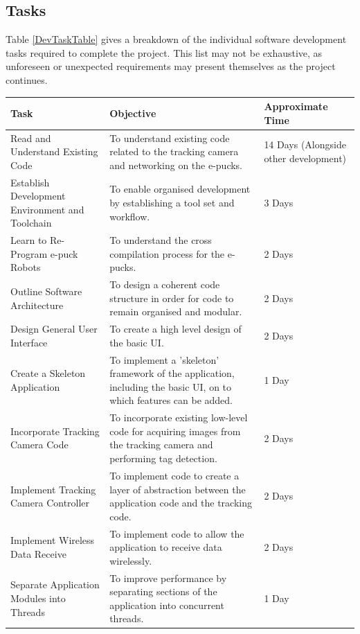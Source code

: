 \documentclass[titlepage,hidelinks,10pt]{article}
\begin{document}
\subsection{Tasks}\label{Tasks}
Table \ref{DevTaskTable} gives a breakdown of the individual software development tasks required to complete the project. This list may not be exhaustive, as unforeseen or unexpected requirements may present themselves as the project continues.

\begin{table}[H]
\begin{tabular}[h]{ |>{\raggedright}p{5cm}|>{\raggedright}p{7cm}|p{3cm}| }
  \hline
  Task & Objective & Approximate Time \\\hline
  Read and Understand Existing Code 				& To understand existing code related to the tracking camera and networking on the e-pucks. 							& 14 Days (Alongside other development)\\ \hline
  Establish Development Environment and Toolchain 	& To enable organised development by establishing a tool set and workflow. 												& 3 Days \\ \hline
  Learn to Re-Program e-puck Robots 				& To understand the cross compilation process for the e-pucks. 															& 2 Days \\ \hline
  Outline Software Architecture 					& To design a coherent code structure in order for code to remain organised and modular. 								& 2 Days \\ \hline
  Design General User Interface 					& To create a high level design of the basic UI. 																		& 2 Days \\ \hline
  Create a Skeleton Application 					& To implement a 'skeleton' framework of the application, including the basic UI, on to which features can be added. 	& 1 Day \\ \hline
  Incorporate Tracking Camera Code 					& To incorporate existing low-level code for acquiring images from the tracking camera and performing tag detection. 	& 2 Days \\ \hline
  Implement Tracking Camera Controller 				& To implement code to create a layer of abstraction between the application code and the tracking code. 				& 2 Days \\ \hline
  Implement Wireless Data Receive 					& To implement code to allow the application to receive data wirelessly. 												& 2 Days \\ \hline
  Separate Application Modules into Threads 		& To improve performance by separating sections of the application into concurrent threads. 							& 1 Day \\ \hline

\end{tabular}
\end{table}
\end{document}

